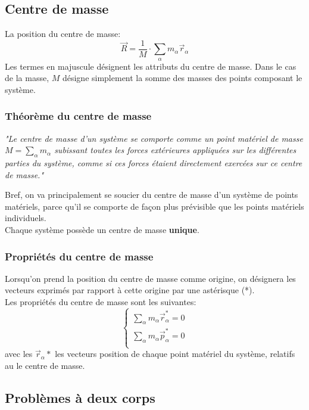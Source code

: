 \documentclass{article}
\numberwithin{equation}{section}
\begin{document}
\subsection{Centre de masse}
La position du centre de masse:
\begin{equation}
	\boxed{ \vec R = \frac{1}{M} \cdot \sum_\alpha m_\alpha \vec r_\alpha }
\end{equation}
Les termes en majuscule désignent les attributs du centre de masse. Dans le cas de la masse, \(M\) désigne simplement la somme des masses des points composant le système.

\subsubsection{Théorème du centre de masse}
\begin{center}
	\emph{"Le centre de masse d'un système se comporte comme un point matériel de masse \(M = \sum_\alpha m_\alpha\) subissant toutes les forces extérieures appliquées sur les différentes parties du système, comme si ces forces étaient directement exercées sur ce centre de masse."}
\end{center}
Bref, on va principalement se soucier du centre de masse d'un système de points matériels, parce qu'il se comporte de façon plus prévisible que les points matériels individuels. \\
Chaque système possède un centre de masse \textbf{unique}.

\subsubsection{Propriétés du centre de masse}
Lorsqu'on prend la position du centre de masse comme origine, on désignera les vecteurs exprimés par rapport à cette origine par une astérisque (*). \\

Les propriétés du centre de masse sont les suivantes:
\begin{equation}
	\begin{cases}
		\sum_\alpha m_\alpha \vec r_\alpha^* = 0 \\
		\sum_\alpha m_\alpha \vec p_\alpha^* =0 \\
	\end{cases}
\end{equation} 
avec les \(\vec r_\alpha *\) les vecteurs position de chaque point matériel du système, relatifs au le centre de masse.

\subsection{Problèmes à deux corps}
\end{document}
